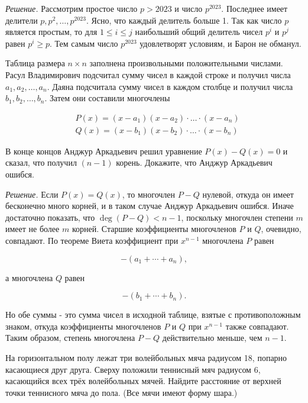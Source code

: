 \textit{Решение.}
Рассмотрим простое число $p>2023$ и число $p^{2023}$. Последнее имеет делители $p, p^2, \ldots, p^{2023}$. Ясно, что каждый делитель больше 1. Так как число $p$ является простым, то для $1 \leq i \leq j$ наибольший общий делитель чисел $p^i$ и $p^j$ равен $p^i \geq p$. Тем самым число $p^{2023}$ удовлетворят условиям, и Барон не обманул.


Таблица размера $n \times n$ заполнена произвольными положительными числами. Расул Владимирович подсчитал сумму чисел в каждой строке и получил числа $a_1, a_2, \ldots, a_n$. Даяна подсчитала сумму чисел в каждом столбце и получил числа $b_1, b_2, \ldots, b_n$. Затем они составили многочлены

$$
\begin{aligned}
& P(x)=\left(x-a_1\right)\left(x-a_2\right) \cdot \ldots \cdot\left(x-a_n\right) \\
& Q(x)=\left(x-b_1\right)\left(x-b_2\right) \cdot \ldots \cdot\left(x-b_n\right)
\end{aligned}
$$


В конце концов Анджур Аркадьевич решил уравнение $P(x)-Q(x)=0$ и сказал, что получил $(n-1)$ корень. Докажите, что Анджур Аркадьевич ошибся.

\textit{Решение.}
Если $P(x)=Q(x)$, то многочлен $P-Q$ нулевой, откуда он имеет бесконечно много корней, и в таком случае Анджур Аркадьевич ошибся. Иначе достаточно показать, что $\operatorname{deg}(P-Q)<n-1$, поскольку многочлен степени $m$ имеет не более $m$ корней. Старшие коэффициенты многочленов $P$ и $Q$, очевидно, совпадают. По теореме Виета коэффициент при $x^{n-1}$ многочлена $P$ равен

$$
-\left(a_1+\cdots+a_n\right),
$$


а многочлена $Q$ равен

$$
-\left(b_1+\cdots+b_n\right) .
$$

Но обе суммы - это сумма чисел в исходной таблице, взятые с противоположным знаком, откуда коэффициенты многочленов $P$ и $Q$ при $x^{n-1}$ также совпадают. Таким образом, степень многочлена $P-Q$ действительно меньше, чем $n-1$.


На горизонтальном полу лежат три волейбольных мяча радиусом 18, попарно касающиеся друг друга. Сверху положили теннисный мяч радиусом 6, касающийся всех трёх волейбольных мячей. Найдите расстояние от верхней точки теннисного мяча до пола. (Все мячи имеют форму шара.)


